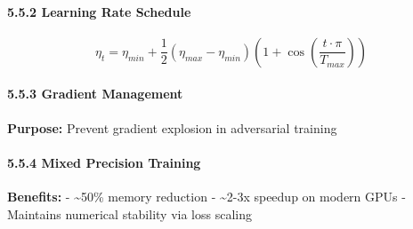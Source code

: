 \paragraph{5.5.2 Learning Rate Schedule}\label{learning-rate-schedule}

\begin{Shaded}
\begin{Highlighting}[]
\OperatorTok{=}\NormalTok{,              }
\OperatorTok{=}           
\NormalTok{)}
\end{Highlighting}
\end{Shaded}

\[\eta_t = \eta_{min} + \frac{1}{2}(\eta_{max} - \eta_{min})\left(1 + \cos\left(\frac{t \cdot \pi}{T_{max}}\right)\right)\]

\paragraph{5.5.3 Gradient Management}\label{gradient-management}

\begin{Shaded}
\begin{Highlighting}[]
\OperatorTok{=}\NormalTok{,}
\OperatorTok{=}  
\NormalTok{)}
\end{Highlighting}
\end{Shaded}

\textbf{Purpose:} Prevent gradient explosion in adversarial training

\paragraph{5.5.4 Mixed Precision
Training}\label{mixed-precision-training}

\begin{Shaded}
\begin{Highlighting}[]
\OperatorTok{=}   
\end{Highlighting}
\end{Shaded}

\textbf{Benefits:} - \textasciitilde50\% memory reduction -
\textasciitilde2-3x speedup on modern GPUs - Maintains numerical
stability via loss scaling

